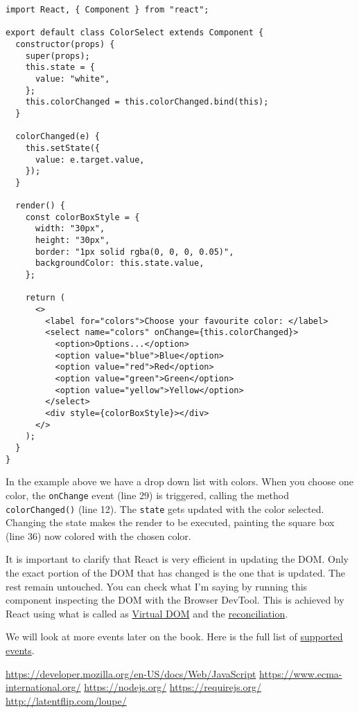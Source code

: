 \documentclass[a4paper, oneside, titlepage, 12pt]{book}
\begin{document}
\begin{verbatim}
import React, { Component } from "react";

export default class ColorSelect extends Component {
  constructor(props) {
    super(props);
    this.state = {
      value: "white",
    };
    this.colorChanged = this.colorChanged.bind(this);
  }

  colorChanged(e) {
    this.setState({
      value: e.target.value,
    });
  }

  render() {
    const colorBoxStyle = {
      width: "30px",
      height: "30px",
      border: "1px solid rgba(0, 0, 0, 0.05)",
      backgroundColor: this.state.value,
    };

    return (
      <>
        <label for="colors">Choose your favourite color: </label>
        <select name="colors" onChange={this.colorChanged}>
          <option>Options...</option>
          <option value="blue">Blue</option>
          <option value="red">Red</option>
          <option value="green">Green</option>
          <option value="yellow">Yellow</option>
        </select>
        <div style={colorBoxStyle}></div>
      </>
    );
  }
}
\end{verbatim}

In the example above we have a drop down list with colors. When you choose one color, the \texttt{onChange} event (line 29) is triggered, calling the method \texttt{colorChanged()} (line 12). The \texttt{state} gets updated with the color selected. Changing the state makes the render to be executed, painting the square box (line 36) now colored with the chosen color.

It is important to clarify that React is very efficient in updating the DOM. Only the exact portion of the DOM that has changed is the one that is updated. The rest remain untouched. You can check what I'm saying by running this component inspecting the DOM with the Browser DevTool. This is achieved by React using what is called as \href{https://reactjs.org/docs/faq-internals.html}{Virtual DOM} and the \href{https://reactjs.org/docs/reconciliation.html}{reconciliation}.
\newline

We will look at more events later on the book. Here is the full list of \href{https://reactjs.org/docs/events.html#reference}{supported events}.


\begin{thebibliography}{100} %
 \url{https://developer.mozilla.org/en-US/docs/Web/JavaScript}
 \url{https://www.ecma-international.org/}
 \url{https://nodejs.org/}
 \url{https://requirejs.org/}
 \url{http://latentflip.com/loupe/}
\end{thebibliography}
\end{document}
